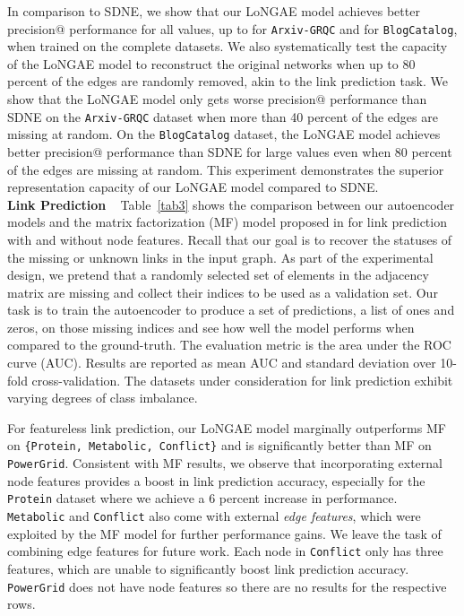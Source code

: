 \documentclass[letterpaper, conference]{IEEEtran}
\begin{document}
In comparison to SDNE, we show that our LoNGAE model achieves better precision@ performance for all  values, up to  for \texttt{Arxiv-GRQC} and  for \texttt{BlogCatalog}, when trained on the complete datasets. We also systematically test the capacity of the LoNGAE model to reconstruct the original networks when up to 80 percent of the edges are randomly removed, akin to the link prediction task. We show that the LoNGAE model only gets worse precision@ performance than SDNE on the \texttt{Arxiv-GRQC} dataset when more than 40 percent of the edges are missing at random. On the \texttt{BlogCatalog} dataset, the LoNGAE model achieves better precision@ performance than SDNE for large  values even when 80 percent of the edges are missing at random. This experiment demonstrates the superior representation capacity of our LoNGAE model compared to SDNE. \\

\noindent \textbf{Link Prediction} ~ Table~\ref{tab3} shows the comparison between our autoencoder models and the matrix factorization (MF) model proposed in \cite{Menon:2011} for link prediction with and without node features. Recall that our goal is to recover the statuses of the missing or unknown links in the input graph. As part of the experimental design, we pretend that a randomly selected set of elements in the adjacency matrix are missing and collect their indices to be used as a validation set. Our task is to train the autoencoder to produce a set of predictions, a list of ones and zeros, on those missing indices and see how well the model performs when compared to the ground-truth. The evaluation metric is the area under the ROC curve (AUC). Results are reported as mean AUC and standard deviation over 10-fold cross-validation. The datasets under consideration for link prediction exhibit varying degrees of class imbalance.

For featureless link prediction, our LoNGAE model marginally outperforms MF on \texttt{\{Protein, Metabolic, Conflict\}} and is significantly better than MF on \texttt{PowerGrid}. Consistent with MF results, we observe that incorporating external node features provides a boost in link prediction accuracy, especially for the \texttt{Protein} dataset where we achieve a 6 percent increase in performance. \texttt{Metabolic} and \texttt{Conflict} also come with external \emph{edge features}, which were exploited by the MF model for further performance gains. We leave the task of combining edge features for future work. Each node in \texttt{Conflict} only has three features, which are unable to significantly boost link prediction accuracy. \texttt{PowerGrid} does not have node features so there are no results for the respective rows.
\end{document}

